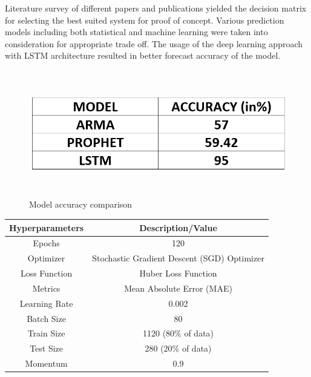\documentclass[12 pt]{report}
\begin{document}
Literature survey of different papers and publications yielded the decision matrix for selecting the best suited system for proof of concept. Various prediction models including both statistical and machine learning were taken into consideration for appropriate trade off. The usage of the deep learning approach with LSTM architecture resulted in better forecast accuracy of the model.
 \begin{figure}[h!]
\centering
\includegraphics[width=12cm,height = 5.5cm,frame]{images/models.png}
\caption{Model accuracy comparison}
\label{fig:Models accuracy comparison}
\end{figure}
\newline 

   \begin{tabular}{||c|c||}
  \hline
     Hyperparameters  &  Description/Value\\ [0.5ex]
  \hline\hline   
     Epochs  &  120\\
  \hline   
     Optimizer  &  Stochastic Gradient Descent (SGD) Optimizer\\
  \hline 
     Loss Function  &  Huber Loss Function\\
  \hline
     Metrics  &  Mean Absolute Error (MAE)\\
  \hline   
     Learning Rate  &  0.002\\
  \hline
     Batch Size  &  80\\
  \hline 
     Train Size  &  1120 (80\% of data)\\
  \hline 
     Test Size  &  280 (20\% of data)\\
  \hline
     Momentum  &  0.9\\ [1ex]
  \hline 
  \end{tabular}
\newline 
\end{document}
